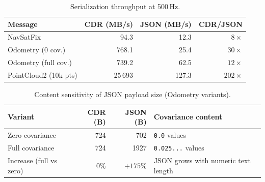 \begin{table}[t]
\caption{Serialization throughput at 500\,Hz.}
\label{tab:throughput_500hz}
\centering
\scriptsize
\setlength{\tabcolsep}{4pt}
\begin{tabular}{lrrr}
\toprule
\textbf{Message} & \textbf{CDR (MB/s)} & \textbf{JSON (MB/s)} & \textbf{CDR/JSON} \\
\midrule
NavSatFix            & 94.3    & 12.3  & $8\times$ \\
Odometry (0 cov.)    & 768.1   & 25.4  & $30\times$ \\
Odometry (full cov.) & 739.2   & 62.5  & $12\times$ \\
PointCloud2 (10k pts)& 25\,693 & 127.3 & $202\times$ \\
\bottomrule
\end{tabular}
\end{table}

\begin{table}[t]
\caption{Content sensitivity of JSON payload size (Odometry variants).}
\label{tab:json_content_sensitivity}
\centering
\scriptsize
\setlength{\tabcolsep}{4pt}
\begin{tabular}{lrrl}
\toprule
\textbf{Variant} & \textbf{CDR (B)} & \textbf{JSON (B)} & \textbf{Covariance content} \\
\midrule
Zero covariance & 724 & 702  & \texttt{0.0} values \\
Full covariance & 724 & 1927 & \texttt{0.025...} values \\
\midrule
Increase (full vs zero) & $0\%$ & $+175\%$ & JSON grows with numeric text length \\
\bottomrule
\end{tabular}
\end{table}
